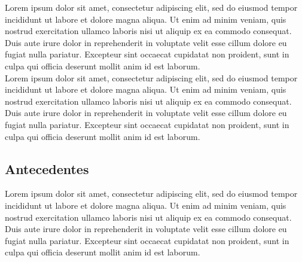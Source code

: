 \documentclass[11pt]{report} %
\begin{document}
Lorem ipsum dolor sit amet, consectetur adipiscing elit, sed do eiusmod tempor incididunt ut labore et dolore magna aliqua. Ut enim ad minim veniam, quis nostrud exercitation ullamco laboris nisi ut aliquip ex ea commodo consequat. Duis aute irure dolor in reprehenderit in voluptate velit esse cillum dolore eu fugiat nulla pariatur. Excepteur sint occaecat cupidatat non proident, sunt in culpa qui officia deserunt mollit anim id est laborum.\\

Lorem ipsum dolor sit amet, consectetur adipiscing elit, sed do eiusmod tempor incididunt ut labore et dolore magna aliqua. Ut enim ad minim veniam, quis nostrud exercitation ullamco laboris nisi ut aliquip ex ea commodo consequat. Duis aute irure dolor in reprehenderit in voluptate velit esse cillum dolore eu fugiat nulla pariatur. Excepteur sint occaecat cupidatat non proident, sunt in culpa qui officia deserunt mollit anim id est laborum.

\subsection{Antecedentes}

Lorem ipsum dolor sit amet, consectetur adipiscing elit, sed do eiusmod tempor incididunt ut labore et dolore magna aliqua. Ut enim ad minim veniam, quis nostrud exercitation ullamco laboris nisi ut aliquip ex ea commodo consequat. Duis aute irure dolor in reprehenderit in voluptate velit esse cillum dolore eu fugiat nulla pariatur. Excepteur sint occaecat cupidatat non proident, sunt in culpa qui officia deserunt mollit anim id est laborum.\\
\end{document}
